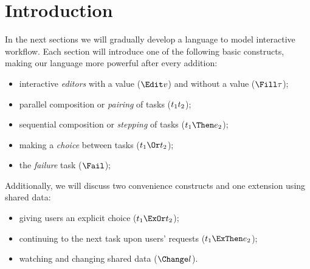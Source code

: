 
\section{Introduction}

In the next sections we will gradually develop a language to model interactive workflow.
Each section will introduce one of the following basic constructs,
making our language more powerful after every addition:
\begin{itemize}
  \item interactive \emph{editors} with a value ($\Edit v$) and without a value ($\Fill \tau$);
  \item parallel composition or \emph{pairing} of tasks ($t_1 \relax t_2$);
  \item sequential composition or \emph{stepping} of tasks ($t_1 \Then e_2$);
  \item making a \emph{choice} between tasks ($t_1 \Or t_2$);
  \item the \emph{failure} task ($\Fail$);
\end{itemize}
Additionally, we will discuss two convenience constructs and one extension using shared data:
\begin{itemize}
  \item giving users an explicit choice ($t_1 \ExOr t_2$);
  \item continuing to the next task upon users' requests ($t_1 \ExThen e_2$);
  \item watching and changing shared data ($\Change l$).
\end{itemize}

